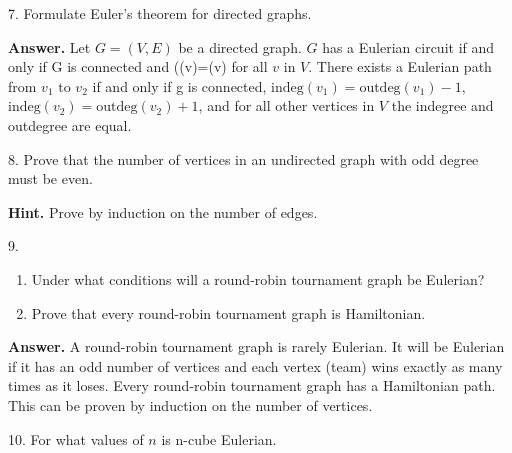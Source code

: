 \documentclass[10pt,]{book}
\theoremstyle{plain}
\theoremstyle{definition}
\theoremstyle{definition}
\theoremstyle{definition}
\theoremstyle{definition}
\theoremstyle{definition}
\numberwithin{equation}{section}
\begin{document}
\begin{exercisegroup}
\item[7.]\hypertarget{exercise-27}{} Formulate Euler's theorem for directed graphs.%
\par\smallskip
\par\smallskip
\noindent\textbf{Answer.}\hypertarget{answer-9}{}\quad
Let  \(G=(V,E)\) be a directed graph. \(G\) has a Eulerian circuit if and only if G is connected and ((v)=(v)\) for all \(v\) in \(V\). There exists a Eulerian path from  \(v_1\textrm{ to } v_2\)  if and only if 
g is connected, \(\text{indeg}\left(v_1\right)=\text{outdeg}\left(v_1\right)-1\), \(\text{indeg}\left(v_2\right)=\text{outdeg}\left(v_2\right)+1\),
 and for all other vertices in \(V\) the indegree and outdegree are equal.%
\item[8.]\hypertarget{exercise-28}{} Prove that the number of vertices in an undirected graph with odd degree must be even.%
\par\smallskip
\par\smallskip
\noindent\textbf{Hint.}\hypertarget{hint-1}{}\quad
 Prove by induction on the number of edges.%
\item[9.]\hypertarget{exercise-29}{}\leavevmode%
\begin{enumerate}[label=\alph*]
\item\hypertarget{li-65}{}Under what conditions will a round-robin tournament graph be Eulerian?%
\item\hypertarget{li-66}{}Prove that every round-robin tournament graph is Hamiltonian.%
\end{enumerate}
%
\par\smallskip
\par\smallskip
\noindent\textbf{Answer.}\hypertarget{answer-10}{}\quad
 A round-robin tournament graph is rarely Eulerian. It will be Eulerian if it has an odd number of vertices and each vertex (team) wins exactly
as many times as it loses. Every round-robin tournament graph has a Hamiltonian path. This can be proven by induction on the number of vertices.%
\item[10.]\hypertarget{exercise-30}{} For what values of \(n\) is  n-cube Eulerian.%
\par\smallskip
\end{exercisegroup}
\par\smallskip\noindent
\typeout{************************************************}
\typeout{************************************************}
\end{document}
